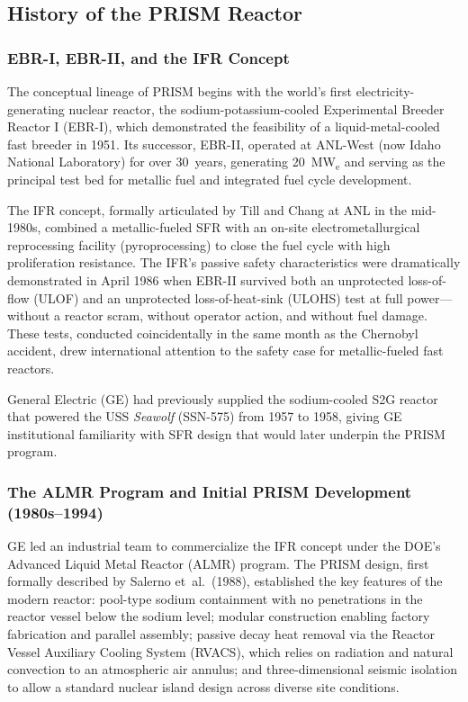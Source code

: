 \documentclass[10pt,twoside]{article}
\begin{document}
\subsection{History of the PRISM Reactor}

\subsubsection{EBR-I, EBR-II, and the IFR Concept}

The conceptual lineage of PRISM begins with the world's first
electricity-generating nuclear reactor, the sodium-potassium-cooled
Experimental Breeder Reactor I (EBR-I), which demonstrated the feasibility
of a liquid-metal-cooled fast breeder in 1951.\cite{Triplett2012}  Its
successor, EBR-II, operated at ANL-West (now Idaho National Laboratory) for
over 30~years, generating 20~MW$_\text{e}$ and serving as the principal test
bed for metallic fuel and integrated fuel cycle development.\cite{Koch1987}

The IFR concept, formally articulated by Till and Chang at ANL in the
mid-1980s,\cite{Till2011} combined a metallic-fueled SFR with an on-site
electrometallurgical reprocessing facility (pyroprocessing) to close the
fuel cycle with high proliferation resistance.  The IFR's passive safety
characteristics were dramatically demonstrated in April 1986 when EBR-II
survived both an unprotected loss-of-flow (ULOF) and an unprotected
loss-of-heat-sink (ULOHS) test at full power---without a reactor scram,
without operator action, and without fuel damage.\cite{Planchon1986}
These tests, conducted coincidentally in the same month as the Chernobyl
accident, drew international attention to the safety case for metallic-fueled
fast reactors.

General Electric (GE) had previously supplied the sodium-cooled S2G reactor
that powered the USS \textit{Seawolf} (SSN-575) from 1957 to 1958, giving
GE institutional familiarity with SFR design that would later underpin the
PRISM program.\cite{Triplett2012}

\subsubsection{The ALMR Program and Initial PRISM Development (1980s--1994)}

GE led an industrial team to commercialize the IFR concept under the DOE's
Advanced Liquid Metal Reactor (ALMR) program.  The PRISM design, first
formally described by Salerno et~al.\ (1988),\cite{Salerno1988} established
the key features of the modern reactor: pool-type sodium containment with no
penetrations in the reactor vessel below the sodium level; modular
construction enabling factory fabrication and parallel assembly; passive
decay heat removal via the Reactor Vessel Auxiliary Cooling System (RVACS),
which relies on radiation and natural convection to an atmospheric air
annulus; and three-dimensional seismic isolation to allow a standard nuclear
island design across diverse site conditions.
\end{document}

